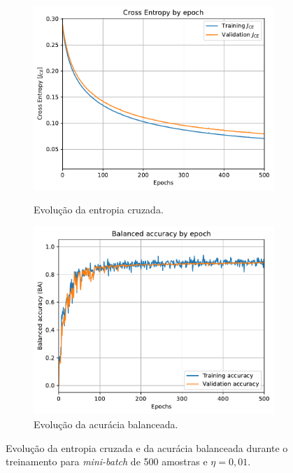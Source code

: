 \begin{figure}[H]
	\begin{subfigure}[H]{0.49\textwidth}
		\centering
		\includegraphics[width = 0.98\linewidth]{../../plot/LR_1/CE_500_epochs_batch_size500}
		\label{fig:CE_500_epochs_batch_size500}
		\caption{Evolução da entropia cruzada.}
	\end{subfigure}
	\begin{subfigure}[H]{0.49\textwidth}
		\centering
		\includegraphics[width = 0.99\linewidth]{../../plot/LR_1/BA_500_epochs_batch_size500}
		\caption{Evolução da acurácia balanceada.}
		\label{fig:BA_500_epochs_batch_size500}
	\end{subfigure}
	\caption{Evolução da entropia cruzada e da acurácia balanceada durante o treinamento para \textit{mini-batch} de 500 amostras e $\eta = 0,01$.}
\end{figure}

